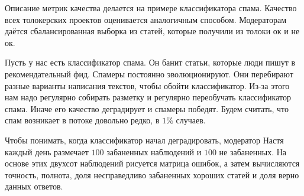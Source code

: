 \documentclass[12pt, a4paper, oneside]{article}
\begin{document}















Описание метрик качества делается на примере классификатора спама. Качество всех толокерских проектов оценивается аналогичным способом. Модераторам даётся сбалансированная выборка из статей, которые получили из толоки ок и не ок.

Пусть у нас есть классификатор спама. Он банит статьи, которые люди пишут в рекомендательный фид. Спамеры постоянно эволюционируют. Они перебирают разные варианты написания текстов, чтобы обойти классификатор. Из-за этого нам надо регулярно собирать разметку и регулярно переобучать классификатор спама. Иначе его качество деградирует и спамеры победят. Будем считать, что спам возникает в потоке довольно редко, в $1\%$ случаев.

Чтобы понимать, когда классификатор начал деградировать, модератор Настя каждый день размечает $100$ забаненных наблюдений и $100$ не забаненных. На основе этих двухсот наблюдений рисуется матрица ошибок, а затем вычисляются точность, полнота, доля несправедливо забаненных хороших статей и доля верно данных ответов. 
\end{document}
